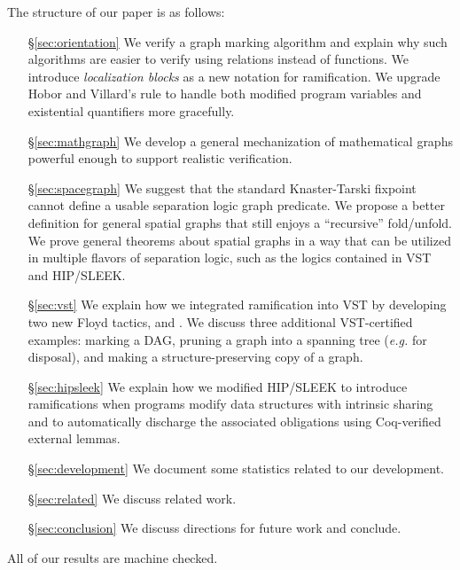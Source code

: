 The structure of our paper is as follows:
\begin{itemize}
\item[\S\ref{sec:orientation}] We verify a graph marking algorithm and explain why such algorithms are easier to verify using relations instead of functions.  We introduce \emph{localization blocks} as a new notation for ramification.  We upgrade Hobor and Villard's  rule to handle both modified program variables and existential quantifiers more gracefully.
\item[\S\ref{sec:mathgraph}] We develop a general mechanization of mathematical graphs powerful enough to support realistic verification. %
\item[\S\ref{sec:spacegraph}] We suggest that the standard Knaster-Tarski fixpoint~\cite{tarski:fixpoint} cannot define a usable separation logic graph predicate.  We propose a better definition for general spatial graphs that still enjoys a ``recursive'' fold/unfold.  We prove general theorems about spatial graphs in a way that can be utilized in multiple flavors of separation logic, such as the logics contained in VST and HIP/SLEEK. %
\item[\S\ref{sec:vst}] We explain how we integrated ramification into VST by developing two new Floyd tactics,  and .  We discuss three additional VST-certified examples: marking a DAG, pruning a graph into a spanning tree (\emph{e.g.} for disposal), and making a structure-preserving copy of a graph.
\item[\S\ref{sec:hipsleek}] We explain how we modified HIP/SLEEK to introduce ramifications when programs modify data structures with intrinsic sharing and to automatically discharge the associated obligations using Coq-verified external lemmas.
\item[\S\ref{sec:development}] We document some statistics related to our development.
\item[\S\ref{sec:related}] We discuss related work.
\item[\S\ref{sec:conclusion}] We discuss directions for future work and conclude.
\end{itemize}
All of our results are machine checked.

